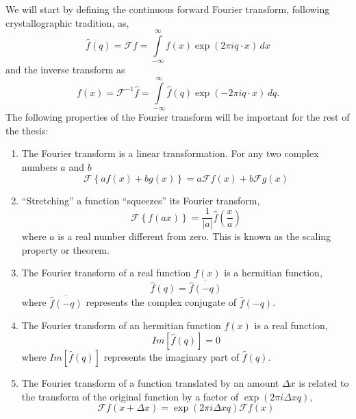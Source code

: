 We will start by defining the continuous forward Fourier transform, following crystallographic tradition, as,
\begin{equation}
\hat{f}(q) = \mathscr{F}f = \int \limits_{-\infty}^{\infty} 
f(x) \exp(2 \pi i q \cdot x) \, dx
\end{equation}
and the inverse transform as
\begin{equation}
f(x) = \mathscr{F}^{-1}\hat{f} = \int \limits_{-\infty}^{\infty} 
\hat{f}(q) \exp(-2 \pi i q \cdot x) \, dq.
\end{equation}
The following properties of the Fourier transform will be important for the rest of the thesis:
\begin{enumerate}
\item The Fourier transform is a linear transformation. For any two complex
  numbers $a$ and $b$
\begin{equation}
\mathscr{F}\left\{ a f(x) + b g(x)\right\} = a \mathscr{F}f(x) + b \mathscr{F}g(x)
\end{equation}

\item ``Stretching'' a function ``squeezes'' its Fourier  transform,
\begin{equation}
\mathscr{F}\left\{f(a x)\right\} = \frac{1}{|a|}\hat{f}(\frac{x}{a}) 
\end{equation}
where $a$ is a real number different from zero. This is known as the scaling
property or theorem.

\item The Fourier transform of a real function $f(x)$ is a hermitian function,  
\begin{equation}
\hat{f}(q) = \overline{\hat{f}(-q)}
\end{equation}
where $\overline{\hat{f}(-q)}$ represents the complex conjugate of $\hat{f}(-q)$.
\item The Fourier transform of an hermitian function $f(x)$ is a real function,
\begin{equation}
Im\left[\hat{f}(q)\right] = 0
\end{equation}
where $Im\left[\hat{f}(q)\right]$ represents the imaginary part of $\hat{f}(q)$.
\item The Fourier transform of a function translated by an amount $\Delta x$ is
  related to the transform of the original function by a factor of $\exp(2 \pi i
  \Delta x q)$,
  \begin{equation}
    \mathscr{F} f(x+\Delta x) = \exp(2 \pi i \Delta x q) \mathscr{F} f(x)
\end{equation}


\end{enumerate}
